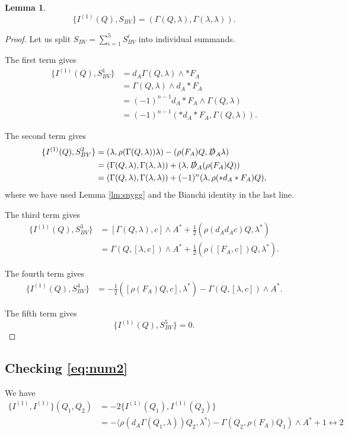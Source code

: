 \documentclass[12pt]{amsart}
\newcommand{\sD}{\slashed{D}}
\newtheorem{lm}[thm]{Lemma}
\begin{document}
\begin{lm}
\[\{I^{(1)}(Q), S_{BV}\} = (\Gamma(Q, \lambda), \Gamma(\lambda, \lambda)).\]
\end{lm}
\begin{proof}
Let us split $S_{BV} = \sum_{i=1}^5 S_{BV}^i$ into individual summands.

The first term gives
\begin{align*}
\{I^{(1)}(Q), S_{BV}^1\} &= d_A \Gamma(Q, \lambda)\wedge \ast F_A\\
&= \Gamma(Q, \lambda)\wedge d_A \ast F_A \\
&= (-1)^{n-1} d_A\ast F_A\wedge \Gamma(Q, \lambda) \\
&= (-1)^{n-1} (\ast d_A \ast F_A, \Gamma(Q, \lambda)).
\end{align*}

The second term gives
\begin{align*}
\{I^{(1)}(Q), S_{BV}^2\} &= (\lambda, \rho(\Gamma(Q, \lambda))\lambda) - (\rho(F_A) Q, \sD_A\lambda) \\
&= (\Gamma(Q, \lambda), \Gamma(\lambda, \lambda)) + (\lambda, \sD_A(\rho(F_A) Q)) \\
&= (\Gamma(Q, \lambda), \Gamma(\lambda, \lambda)) + (-1)^n (\lambda, \rho(\ast d_A\ast F_A) Q),
\end{align*}
where we have used Lemma \cref{lm:snygg} and the Bianchi identity in the last line.

The third term gives
\begin{align*}
\{I^{(1)}(Q), S_{BV}^3\} &= [\Gamma(Q, \lambda), c]\wedge A^* + \frac{1}{2}(\rho(d_A d_A c)Q, \lambda^*) \\
&= \Gamma(Q, [\lambda, c])\wedge A^* + \frac{1}{2}(\rho([F_A, c]) Q, \lambda^*).
\end{align*}

The fourth term gives
\begin{align*}
\{I^{(1)}(Q), S_{BV}^4\} &= -\frac{1}{2}([\rho(F_A) Q, c], \lambda^*) - \Gamma(Q, [\lambda, c])\wedge A^*.
\end{align*}

The fifth term gives
\[\{I^{(1)}(Q), S_{BV}^5\} = 0.\]
\end{proof}

\subsection{Checking \eqref{eq:num2}}

We have
\begin{align*}
\{I^{(1)}, I^{(1)}\}(Q_1, Q_2) &= -2\{I^{(1)}(Q_1), I^{(1)}(Q_2)\} \\
&= -\langle \rho(d_A \Gamma(Q_1, \lambda))Q_2, \lambda^*\rangle - \Gamma(Q_2, \rho(F_A)Q_1)\wedge A^* + 1\leftrightarrow 2
\end{align*}
\end{document}
